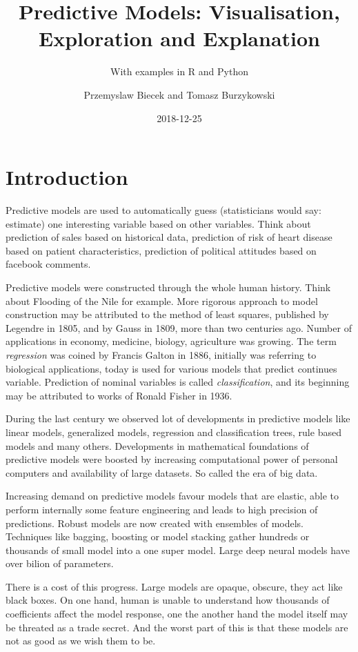 \documentclass[]{krantz}
\title{Predictive Models: Visualisation, Exploration and Explanation}
\subtitle{With examples in R and Python}
\author{Przemyslaw Biecek and Tomasz Burzykowski}
\date{2018-12-25}
\theoremstyle{definition}
\theoremstyle{definition}
\theoremstyle{definition}
\theoremstyle{remark}
\begin{document}
\maketitle

{
\hypersetup{linkcolor=black}
\setcounter{tocdepth}{2}
\tableofcontents
}
\listoftables
\listoffigures
\hypertarget{introduction}{%
\section{Introduction}\label{introduction}}

Predictive models are used to automatically guess (statisticians would
say: estimate) one interesting variable based on other variables. Think
about prediction of sales based on historical data, prediction of risk
of heart disease based on patient characteristics, prediction of
political attitudes based on facebook comments.

Predictive models were constructed through the whole human history.
Think about Flooding of the Nile for example. More rigorous approach to
model construction may be attributed to the method of least squares,
published by Legendre in 1805, and by Gauss in 1809, more than two
centuries ago. Number of applications in economy, medicine, biology,
agriculture was growing. The term \emph{regression} was coined by
Francis Galton in 1886, initially was referring to biological
applications, today is used for various models that predict continues
variable. Prediction of nominal variables is called
\emph{classification}, and its beginning may be attributed to works of
Ronald Fisher in 1936.

During the last century we observed lot of developments in predictive
models like linear models, generalized models, regression and
classification trees, rule based models and many others. Developments in
mathematical foundations of predictive models were boosted by increasing
computational power of personal computers and availability of large
datasets. So called the era of big data.

Increasing demand on predictive models favour models that are elastic,
able to perform internally some feature engineering and leads to high
precision of predictions. Robust models are now created with ensembles
of models. Techniques like bagging, boosting or model stacking gather
hundreds or thousands of small model into a one super model. Large deep
neural models have over bilion of parameters.

There is a cost of this progress. Large models are opaque, obscure, they
act like black boxes. On one hand, human is unable to understand how
thousands of coefficients affect the model response, one the another
hand the model itself may be threated as a trade secret. And the worst
part of this is that these models are not as good as we wish them to be.
\end{document}
